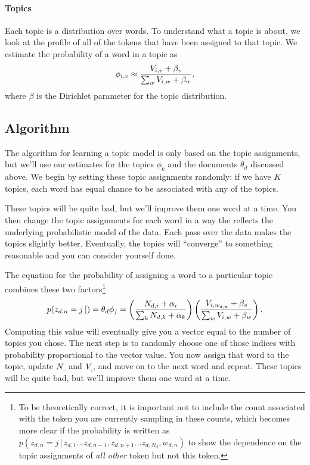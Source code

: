 \paragraph{Topics}

Each topic is a distribution over words.  To understand what a topic is about,
we look at the profile of all of the tokens that have been assigned to that
topic.  We estimate the probability of a word in a topic as
\begin{equation}
\phi_{i,v} \approx \frac{V_{i,v} + \beta_v}{\sum_w V_{i,w} + \beta_w},
\label{eq:phi_map}
\end{equation}
where $\beta$ is the Dirichlet parameter for the topic distribution.

\subsection{Algorithm}

The algorithm for learning a topic model is only based on the topic assignments,
but we'll use our estimates for the topics $\phi_k$ and the documents $\theta_d$
discussed above.  We begin by setting these topic assignments randomly: if we
have $K$ topics, each word has equal chance to be associated with any of the
topics.

These topics will be quite bad, but we'll improve them one word at a time.  You
then change the topic assignments for each word in a way the reflects the
underlying probabilistic model of the data.  Each pass over the data makes the
topics slightly better.  Eventually, the topics will ``converge'' to something
reasonable and you can consider yourself done.

The equation for the probability of assigning a word to a particular topic
combines these two factors\footnote{To be theoretically correct, it is important
not to include the count associated with the token you are currently sampling in
these counts, which becomes more clear if the probability is written as
$p(z_{d,n}=j\,|\,z_{d,1}\dots z_{d,n-1},z_{d,n+1}\dots z_{d,N_d}, w_{d,n})$ to
show the dependence on the topic assignments of \emph{all other} token but not
this token.}
\begin{align}
p(z_{d,n}=j\,|) = \theta_d
\phi_j = \left(\frac{N_{d,i} + \alpha_i}{\sum_k N_{d,k} + \alpha_k} \right) \left( \frac{V_{i,w_{d,n}} + \beta_v}{\sum_w V_{i,w} +
    \beta_w} \right).
\end{align}
Computing this value will eventually give you a vector equal to the number of
topics you chose.  The next step is to randomly choose one of those indices with
probability proportional to the vector value.  You now assign that word to the
topic, update $N_{,}$ and $V_{,}$, and move on to the next word and repeat.
These topics will be quite bad, but we'll improve them one word at a time.

